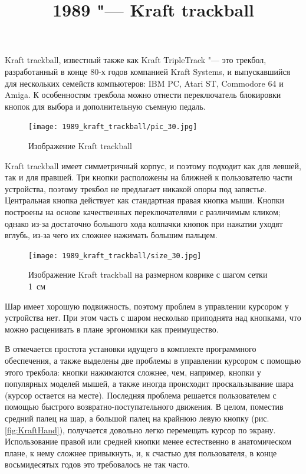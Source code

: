 \documentclass[11pt, a4paper]{article}
\begin{document}
\title{1989 "--- Kraft trackball}
\date{}
\maketitle
{}
Kraft trackball, известный также как Kraft TripleTrack \cite{triple} "---	 это трекбол, разработанный в конце 80-х годов компанией Kraft Systems, и выпускавшийся для нескольких семейств компьютеров: IBM PC, Atari ST, Commodore 64 и Amiga. К особенностям трекбола можно отнести переключатель блокировки кнопок для выбора и дополнительную съемную педаль.

\begin{figure}[h]
    \centering
    \texttt{[image: 1989\_kraft\_trackball/pic\_30.jpg]}
    \caption{Изображение Kraft trackball}
    \label{fig:KraftPhoto}
\end{figure}

Kraft trackball имеет симметричный корпус, и поэтому подходит как для левшей, так и для правшей. Три кнопки расположены на ближней к пользователю части устройства, поэтому трекбол не предлагает никакой опоры под запястье. Центральная кнопка действует как стандартная правая кнопка мыши. Кнопки построены на основе качественных переключателями с различимым кликом; однако из-за достаточно большого хода колпачки кнопок при нажатии уходят вглубь, из-за чего их сложнее нажимать большим пальцем.

\begin{figure}[h]
    \centering
    \texttt{[image: 1989\_kraft\_trackball/size\_30.jpg]}
    \caption{Изображение Kraft trackball на размерном коврике с шагом сетки 1~см}
    \label{fig:KraftSize}
\end{figure}

Шар имеет хорошую подвижность, поэтому проблем в управлении курсором у устройства нет. При этом часть с шаром несколько приподнята над кнопками, что можно расценивать в плане эргономики как преимущество.

В \cite{Hudnall} отмечается простота установки идущего в комплекте программного обеспечения, а также выделены две проблемы в управлении курсором с помощью этого трекбола: кнопки нажимаются сложнее, чем, например, кнопки у популярных моделей мышей, а также иногда происходит проскальзывание шара (курсор остается на месте). Последняя проблема решается пользователем с помощью быстрого возвратно-поступательного движения. В целом, поместив средний палец на шар, а большой палец на крайнюю левую кнопку (рис. \ref{fig:KraftHand}), получается довольно легко перемещать курсор по экрану. Использование правой или средней кнопки менее естественно в анатомическом плане, к нему сложнее привыкнуть, и, к счастью для пользователя, в конце восьмидесятых годов это требовалось не так часто.
\end{document}
